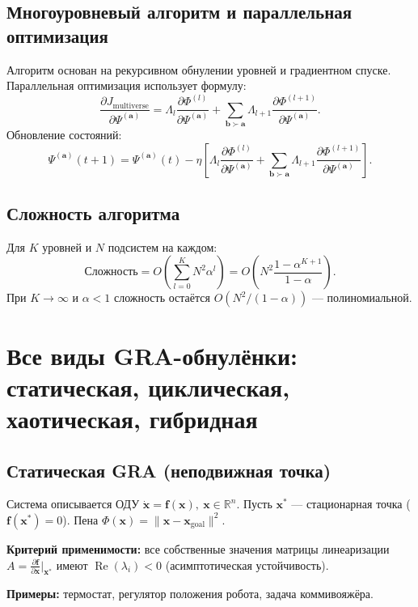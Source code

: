 \documentclass[12pt,a4paper]{article}
\begin{document}
\subsection{Многоуровневый алгоритм и параллельная оптимизация}

Алгоритм основан на рекурсивном обнулении уровней и градиентном спуске. Параллельная оптимизация использует формулу:
\[
\frac{\partial J_{\text{multiverse}}}{\partial \Psi^{(\mathbf{a})}} = \Lambda_l \frac{\partial \Phi^{(l)}}{\partial \Psi^{(\mathbf{a})}} + \sum_{\mathbf{b}\succ\mathbf{a}} \Lambda_{l+1} \frac{\partial \Phi^{(l+1)}}{\partial \Psi^{(\mathbf{a})}}.
\]
Обновление состояний:
\[
\Psi^{(\mathbf{a})}(t+1) = \Psi^{(\mathbf{a})}(t) - \eta \left[ \Lambda_l \frac{\partial \Phi^{(l)}}{\partial \Psi^{(\mathbf{a})}} + \sum_{\mathbf{b}\succ\mathbf{a}} \Lambda_{l+1} \frac{\partial \Phi^{(l+1)}}{\partial \Psi^{(\mathbf{a})}} \right].
\]

\subsection{Сложность алгоритма}

Для \(K\) уровней и \(N\) подсистем на каждом:
\[
\text{Сложность} = O\!\left( \sum_{l=0}^K N^2 \alpha^l \right) = O\!\left( N^2 \frac{1-\alpha^{K+1}}{1-\alpha} \right).
\]
При \(K\to\infty\) и \(\alpha<1\) сложность остаётся \(O(N^2/(1-\alpha))\) — полиномиальной.

\section{Все виды GRA-обнулёнки: статическая, циклическая, хаотическая, гибридная}

\subsection{Статическая GRA (неподвижная точка)}

Система описывается ОДУ \(\dot{\mathbf{x}} = \mathbf{f}(\mathbf{x}),\ \mathbf{x}\in\mathbb{R}^n\). Пусть \(\mathbf{x}^*\) — стационарная точка (\(\mathbf{f}(\mathbf{x}^*)=0\)). Пена \(\Phi(\mathbf{x}) = \|\mathbf{x} - \mathbf{x}_{\text{goal}}\|^2\).

\textbf{Критерий применимости:} все собственные значения матрицы линеаризации \(A = \frac{\partial\mathbf{f}}{\partial\mathbf{x}}\big|_{\mathbf{x}^*}\) имеют \(\operatorname{Re}(\lambda_i) < 0\) (асимптотическая устойчивость).

\textbf{Примеры:} термостат, регулятор положения робота, задача коммивояжёра.
\end{document}

